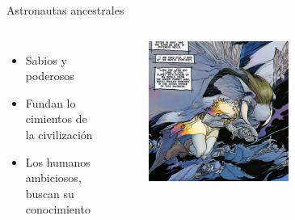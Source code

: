 \begin{frame}{Astronautas ancestrales}
\begin{columns}
 \begin{itemize}
    \item Sabios y poderosos
    \item Fundan lo cimientos de la civilización
    \item Los humanos ambiciosos, buscan su conocimiento
 \end{itemize}
    \begin{figure}[htb]
      \centering
      \includegraphics[width=0.6\textwidth]{img/tropes/astronautas}
    \end{figure}
  \end{columns}
\end{frame}
\note[itemize]{
	\item
}

